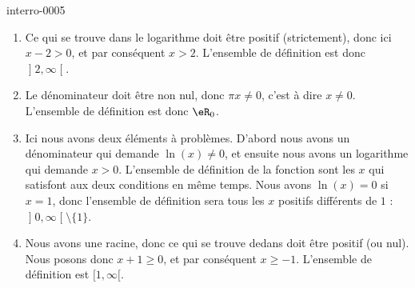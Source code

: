 
\begin{corrige}{interro-0005}

    \begin{enumerate}
        \item
            Ce qui se trouve dans le logarithme doit être positif (strictement), donc ici $x-2>0$, et par conséquent $x>2$. L'ensemble de définition est donc $\mathopen] 2 , \infty \mathclose[$.
        \item
            Le dénominateur doit être non nul, donc $\pi x\neq 0$, c'est à dire $x\neq 0$. L'ensemble de définition est donc $\eR_0$.
        \item
            Ici nous avons deux éléments à problèmes. D'abord nous avons un dénominateur qui demande $\ln(x)\neq 0$, et ensuite nous avons un logarithme qui demande $x>0$. L'ensemble de définition de la fonction sont les $x$ qui satisfont aux deux conditions en même temps. Nous avons $\ln(x)=0$ si $x=1$, donc l'ensemble de définition sera tous les $x$ positifs différents de $1$ : $\mathopen] 0 , \infty \mathclose[\setminus\{ 1 \}$.
        \item
            Nous avons une racine, donc ce qui se trouve dedans doit être positif (ou nul). Nous posons donc $x+1\geq 0$, et par conséquent $x\geq -1$. L'ensemble de définition est \( \mathopen[ 1 , \infty [\).
    \end{enumerate}

\end{corrige}

